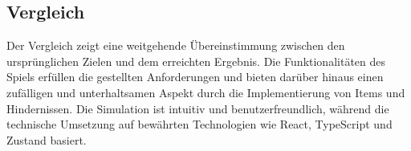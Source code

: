 \documentclass{article}
\begin{document}
\subsection{Vergleich}
Der Vergleich zeigt eine weitgehende Übereinstimmung zwischen den ursprünglichen Zielen und dem erreichten Ergebnis. Die Funktionalitäten des Spiels erfüllen die gestellten Anforderungen und bieten darüber hinaus einen zufälligen und unterhaltsamen Aspekt durch die Implementierung von Items und Hindernissen. Die Simulation ist intuitiv und benutzerfreundlich, während die technische Umsetzung auf bewährten Technologien wie React, TypeScript und Zustand basiert.
\end{document}
